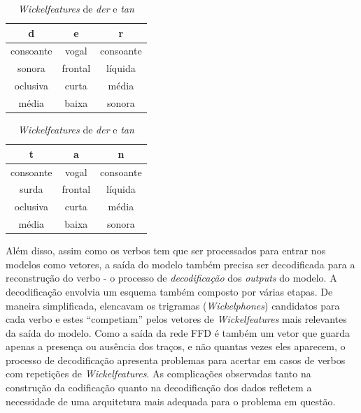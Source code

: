 \begin{table}[H]
    \begin{minipage}{.5\linewidth}
      \centering
      \caption{}
        \begin{tabular}{ccc}
        d                    & e                    & r                    \\ \hline
        consoante            & vogal                & consoante            \\
        sonora               & frontal              & líquida              \\
        oclusiva                 & curta                & média                \\
        média               & baixa                  & sonora\\
        \end{tabular}
        \label{tab:der}
    \end{minipage}%
    \begin{minipage}{.5\linewidth}
      \centering
        \caption{}

    \begin{tabular}{ccc}
    t                    & a                    & n                    \\ \hline
    consoante            & vogal                & consoante            \\
    surda                & frontal              & líquida              \\
    oclusiva                 & curta                & média                \\
    média                & baixa                  & sonora               \\

    \end{tabular}
    \label{tab:tan}
    \end{minipage} 
\caption{\textit{Wickelfeatures} de \textit{der} e \textit{tan}}
\label{tab:wickeldertan}
\end{table}

Além disso, assim como os verbos tem que ser processados para entrar nos modelos como vetores, a saída do modelo também precisa ser decodificada para a reconstrução do verbo -  o processo de \textit{decodificação} dos \textit{outputs} do modelo. A decodificação envolvia um esquema também composto por várias etapas. De maneira simplificada, \cite{rumelhart:1986} elencavam os trigramas (\textit{Wickelphones}) candidatos para cada verbo e estes “competiam” pelos vetores de \textit{Wickelfeatures} mais relevantes da saída do modelo. Como a saída da rede FFD é também um vetor que guarda apenas a presença ou ausência dos traços, e não quantas vezes eles aparecem, o processo de decodificação apresenta problemas para acertar em casos de verbos com repetições de \textit{Wickelfeatures}. As complicações observadas tanto na construção da codificação quanto na decodificação dos dados refletem a necessidade de uma arquitetura mais adequada para o problema em questão.

